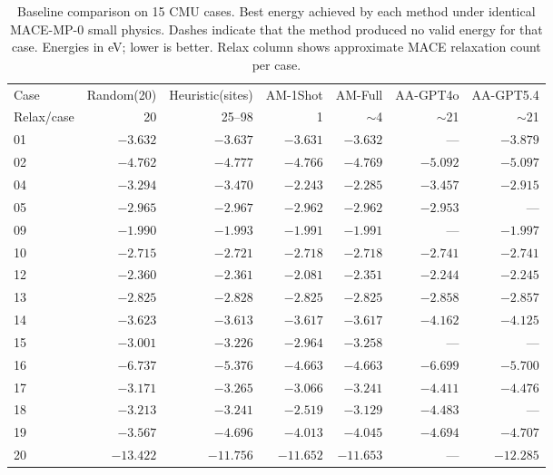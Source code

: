 \begin{table}[h]
\centering
\scriptsize
\caption{Baseline comparison on 15 CMU cases. Best energy achieved by each method under identical MACE-MP-0 small physics. Dashes indicate that the method produced no valid energy for that case. Energies in eV; lower is better. Relax column shows approximate MACE relaxation count per case.}
\label{tab:si-baseline-comparison}
\begin{tabular}{lrrrrrr}
\toprule
Case & Random(20) & Heuristic(sites) & AM-1Shot & AM-Full & AA-GPT4o & AA-GPT5.4 \\
Relax/case & 20 & 25--98 & 1 & $\sim$4 & $\sim$21 & $\sim$21 \\
\midrule
  01 & $-3.632$ & $-3.637$ & $-3.631$ & $-3.632$ & --- & $-3.879$ \\
  02 & $-4.762$ & $-4.777$ & $-4.766$ & $-4.769$ & $-5.092$ & $-5.097$ \\
  04 & $-3.294$ & $-3.470$ & $-2.243$ & $-2.285$ & $-3.457$ & $-2.915$ \\
  05 & $-2.965$ & $-2.967$ & $-2.962$ & $-2.962$ & $-2.953$ & --- \\
  09 & $-1.990$ & $-1.993$ & $-1.991$ & $-1.991$ & --- & $-1.997$ \\
  10 & $-2.715$ & $-2.721$ & $-2.718$ & $-2.718$ & $-2.741$ & $-2.741$ \\
  12 & $-2.360$ & $-2.361$ & $-2.081$ & $-2.351$ & $-2.244$ & $-2.245$ \\
  13 & $-2.825$ & $-2.828$ & $-2.825$ & $-2.825$ & $-2.858$ & $-2.857$ \\
  14 & $-3.623$ & $-3.613$ & $-3.617$ & $-3.617$ & $-4.162$ & $-4.125$ \\
  15 & $-3.001$ & $-3.226$ & $-2.964$ & $-3.258$ & --- & --- \\
  16 & $-6.737$ & $-5.376$ & $-4.663$ & $-4.663$ & $-6.699$ & $-5.700$ \\
  17 & $-3.171$ & $-3.265$ & $-3.066$ & $-3.241$ & $-4.411$ & $-4.476$ \\
  18 & $-3.213$ & $-3.241$ & $-2.519$ & $-3.129$ & $-4.483$ & --- \\
  19 & $-3.567$ & $-4.696$ & $-4.013$ & $-4.045$ & $-4.694$ & $-4.707$ \\
  20 & $-13.422$ & $-11.756$ & $-11.652$ & $-11.653$ & --- & $-12.285$ \\
\bottomrule
\end{tabular}
\end{table}
